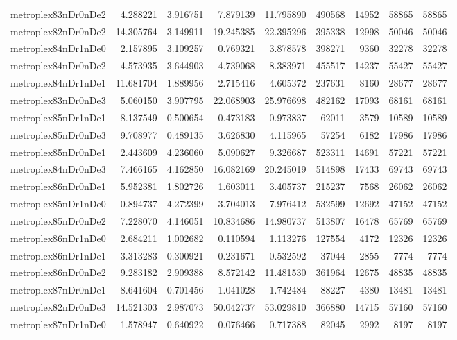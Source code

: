 \begin{longtable}{|l|r|r|r|r|r|r|r|r|}
metroplex83nDr0nDe2 & 4.288221 & 3.916751 & 7.879139 & 11.795890 & 490568 & 14952 & 58865 & 58865 \\
metroplex82nDr0nDe2 & 14.305764 & 3.149911 & 19.245385 & 22.395296 & 395338 & 12998 & 50046 & 50046 \\
metroplex84nDr1nDe0 & 2.157895 & 3.109257 & 0.769321 & 3.878578 & 398271 & 9360 & 32278 & 32278 \\
metroplex84nDr0nDe2 & 4.573935 & 3.644903 & 4.739068 & 8.383971 & 455517 & 14237 & 55427 & 55427 \\
metroplex84nDr1nDe1 & 11.681704 & 1.889956 & 2.715416 & 4.605372 & 237631 & 8160 & 28677 & 28677 \\
metroplex83nDr0nDe3 & 5.060150 & 3.907795 & 22.068903 & 25.976698 & 482162 & 17093 & 68161 & 68161 \\
metroplex85nDr1nDe1 & 8.137549 & 0.500654 & 0.473183 & 0.973837 & 62011 & 3579 & 10589 & 10589 \\
metroplex85nDr0nDe3 & 9.708977 & 0.489135 & 3.626830 & 4.115965 & 57254 & 6182 & 17986 & 17986 \\
metroplex85nDr0nDe1 & 2.443609 & 4.236060 & 5.090627 & 9.326687 & 523311 & 14691 & 57221 & 57221 \\
metroplex84nDr0nDe3 & 7.466165 & 4.162850 & 16.082169 & 20.245019 & 514898 & 17433 & 69743 & 69743 \\
metroplex86nDr0nDe1 & 5.952381 & 1.802726 & 1.603011 & 3.405737 & 215237 & 7568 & 26062 & 26062 \\
metroplex85nDr1nDe0 & 0.894737 & 4.272399 & 3.704013 & 7.976412 & 532599 & 12692 & 47152 & 47152 \\
metroplex85nDr0nDe2 & 7.228070 & 4.146051 & 10.834686 & 14.980737 & 513807 & 16478 & 65769 & 65769 \\
metroplex86nDr1nDe0 & 2.684211 & 1.002682 & 0.110594 & 1.113276 & 127554 & 4172 & 12326 & 12326 \\
metroplex86nDr1nDe1 & 3.313283 & 0.300921 & 0.231671 & 0.532592 & 37044 & 2855 & 7774 & 7774 \\
metroplex86nDr0nDe2 & 9.283182 & 2.909388 & 8.572142 & 11.481530 & 361964 & 12675 & 48835 & 48835 \\
metroplex87nDr0nDe1 & 8.641604 & 0.701456 & 1.041028 & 1.742484 & 88227 & 4380 & 13481 & 13481 \\
metroplex82nDr0nDe3 & 14.521303 & 2.987073 & 50.042737 & 53.029810 & 366880 & 14715 & 57160 & 57160 \\
metroplex87nDr1nDe0 & 1.578947 & 0.640922 & 0.076466 & 0.717388 & 82045 & 2992 & 8197 & 8197 \\

\end{longtable}
